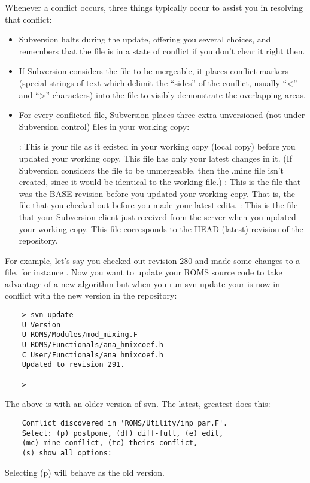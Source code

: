 Whenever a conflict occurs, three things typically occur to assist you in
resolving that conflict:
\begin{itemize}
        \item Subversion halts during the update, offering you several choices,
and remembers that the file is in a state of conflict if you don't clear it
right then.
        \item If Subversion considers the file to be mergeable, it places
conflict markers (special strings of text which delimit the ``sides'' of the
conflict, usually ``<'' and ``>'' characters) into the file to visibly
demonstrate the overlapping areas.
        \item For every conflicted file, Subversion places three extra
unversioned (not under Subversion control) files in your working copy: 
\begin{klist}
            : This is your file as it existed
      in your working copy (local copy) before you updated your working
      copy. This file has only your latest changes in it. (If Subversion
      considers the file to be unmergeable, then the .mine file isn't
      created, since it would be identical to the working file.)
            : This is the file that was the
      BASE revision before you updated your working copy. That is,
      the file that you checked out before you made your latest edits.
            : This is the file that your
      Subversion client just received from the server when you updated
      your working copy. This file corresponds to the HEAD (latest)
      revision of the repository.
  \end{klist}
\end{itemize}
For example, let's say you checked out revision 280 and made some changes
to a file, for instance .
Now you want to update your
ROMS source code to take advantage of a new algorithm but when you run
svn update your  is now in conflict with the new
version in the repository:
\begin{verbatim}
    > svn update
    U Version
    U ROMS/Modules/mod_mixing.F
    U ROMS/Functionals/ana_hmixcoef.h
    C User/Functionals/ana_hmixcoef.h
    Updated to revision 291.

    >
\end{verbatim}
The above is with an older version of svn. The latest, greatest does this:
\begin{verbatim}
    Conflict discovered in 'ROMS/Utility/inp_par.F'.
    Select: (p) postpone, (df) diff-full, (e) edit,
    (mc) mine-conflict, (tc) theirs-conflict,
    (s) show all options:
\end{verbatim}
Selecting (p) will behave as the old version.

